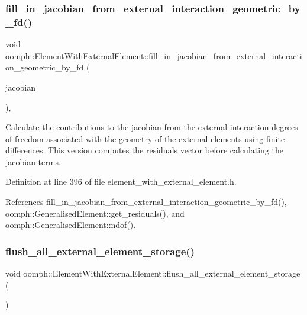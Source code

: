 \subsubsection{\texorpdfstring{fill\+\_\+in\+\_\+jacobian\+\_\+from\+\_\+external\+\_\+interaction\+\_\+geometric\+\_\+by\+\_\+fd()}{fill\_in\_jacobian\_from\_external\_interaction\_geometric\_by\_fd()}\hspace{0.1cm}{\footnotesize\ttfamily [2/2]}}
{\footnotesize\ttfamily void oomph\+::\+Element\+With\+External\+Element\+::fill\+\_\+in\+\_\+jacobian\+\_\+from\+\_\+external\+\_\+interaction\+\_\+geometric\+\_\+by\+\_\+fd (\begin{DoxyParamCaption}\item[{\hyperlink{classoomph_1_1DenseMatrix}{Dense\+Matrix}$<$ double $>$ \&}]{jacobian }\end{DoxyParamCaption})\hspace{0.3cm}{\ttfamily [inline]}, {\ttfamily [protected]}}



Calculate the contributions to the jacobian from the external interaction degrees of freedom associated with the geometry of the external elements using finite differences. This version computes the residuals vector before calculating the jacobian terms. 



Definition at line 396 of file element\+\_\+with\+\_\+external\+\_\+element.\+h.



References fill\+\_\+in\+\_\+jacobian\+\_\+from\+\_\+external\+\_\+interaction\+\_\+geometric\+\_\+by\+\_\+fd(), oomph\+::\+Generalised\+Element\+::get\+\_\+residuals(), and oomph\+::\+Generalised\+Element\+::ndof().

\mbox{\label{classoomph_1_1ElementWithExternalElement_af8ad5670124479401b925f923a9713b0}} 
\subsubsection{\texorpdfstring{flush\+\_\+all\+\_\+external\+\_\+element\+\_\+storage()}{flush\_all\_external\_element\_storage()}}
{\footnotesize\ttfamily void oomph\+::\+Element\+With\+External\+Element\+::flush\+\_\+all\+\_\+external\+\_\+element\+\_\+storage (\begin{DoxyParamCaption}{ }\end{DoxyParamCaption})}



